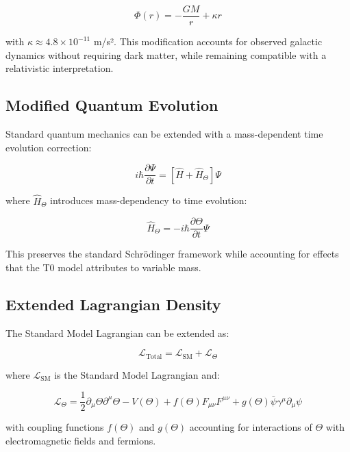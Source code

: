 \documentclass[12pt,a4paper]{article}
\begin{document}
	\begin{equation}
		\Phi(r) = -\frac{GM}{r} + \kappa r
	\end{equation}
	
	with $\kappa \approx 4.8\times10^{-11}$ m/s². This modification accounts for observed galactic dynamics without requiring dark matter, while remaining compatible with a relativistic interpretation.
	
	\subsection{Modified Quantum Evolution}
	
	Standard quantum mechanics can be extended with a mass-dependent time evolution correction:
	
	\begin{equation}
		i\hbar\frac{\partial\Psi}{\partial t} = [\hat{H} + \hat{H}_{\Theta}]\Psi
	\end{equation}
	
	where $\hat{H}_{\Theta}$ introduces mass-dependency to time evolution:
	
	\begin{equation}
		\hat{H}_{\Theta} = -i\hbar\frac{\partial\Theta}{\partial t}\Psi
	\end{equation}
	
	This preserves the standard Schrödinger framework while accounting for effects that the T0 model attributes to variable mass.
	
	\subsection{Extended Lagrangian Density}
	
	The Standard Model Lagrangian can be extended as:
	
	\begin{equation}
		\mathcal{L}_{\text{Total}} = \mathcal{L}_{\text{SM}} + \mathcal{L}_{\Theta}
	\end{equation}
	
	where $\mathcal{L}_{\text{SM}}$ is the Standard Model Lagrangian and:
	
	\begin{equation}
		\mathcal{L}_{\Theta} = \frac{1}{2}\partial_{\mu}\Theta\partial^{\mu}\Theta - V(\Theta) + f(\Theta)F_{\mu\nu}F^{\mu\nu} + g(\Theta)\bar{\psi}\gamma^{\mu}\partial_{\mu}\psi
	\end{equation}
	
	with coupling functions $f(\Theta)$ and $g(\Theta)$ accounting for interactions of $\Theta$ with electromagnetic fields and fermions.
	
\end{document}
